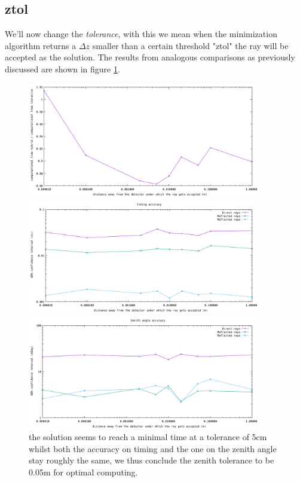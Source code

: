 \subsection{ztol}
We'll now change the \textit{tolerance}, with this we mean when 
the minimization algorithm returns a $\Delta z$ smaller than a certain
threshold "ztol" the ray will be accepted as the solution.  
The results from analogous comparisons as
previously discussed are shown in figure \ref{fig:ztolinfl}.
\begin{figure}
	\centering
	\begin{minipage}{\textwidth}
		\includegraphics[width=0.9\textwidth]{figures/ZtolVsTime2.pdf}
	\end{minipage}
	\begin{minipage}{\textwidth}
		\includegraphics[width=0.9\textwidth]{figures/ZtolVsSigmaTime.pdf}
	\end{minipage}
	\begin{minipage}{\textwidth}
		\includegraphics[width=0.9\textwidth]{figures/ZtolVsSigmaAZ.pdf}
	\end{minipage}
\caption{the solution seems to reach a minimal time at a tolerance of 5cm whilst both the accuracy on timing and the one on the zenith angle stay roughly the same, we thus conclude the zenith
tolerance to be 0.05m for optimal computing.}
\label{fig:ztolinfl}
\end{figure}
